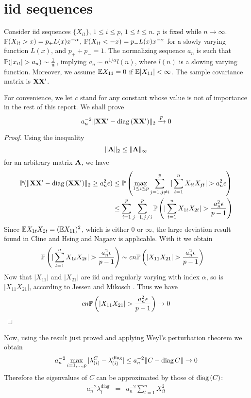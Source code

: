 \documentclass{article}
\begin{document}
\section{iid sequences}\label{sec:iid}
Consider iid sequences $\{X_{it}\}$, $1 \leq i \leq p$, $1 \leq t \leq
n$. $p$ is fixed while $n \to \infty$. $\mathbb{P}(X_{it} > x) = p_+ L(x)
x^{-\alpha}$, $\mathbb{P}(X_{it} < -x) = p_- L(x) x^{-\alpha}$ for a slowly
varying function $L(x)$, and $p_+ + p_- = 1$. The normalizing sequence
$a_n$ is such that $\mathbb{P}(|x_{it}| > a_n) \sim {1 \over n}$, implying
$a_n \sim n^{1/\alpha} l(n)$, where $l(n)$ is a slowing varying
function. Moreover, we assume $\mathbb{E} X_{11} = 0$ if $\mathbb{E} |X_{11}| <
\infty$. The sample covariance matrix is $\mathbf{XX'}$.

For convenience, we let $c$ stand for any constant whose value is not
of importance in the rest of this report. We shall prove
\[
a_n^{-2}\|\mathbf{XX'} - \text{diag\,}(\mathbf{XX'})\|_2 \xrightarrow{P} 0
\]

\begin{proof}
  Using the inequality
  \[
  \|\mathbf{A}\|_2 \leq \|\mathbf{A}\|_\infty
  \]
  for an arbitrary matrix $\mathbf{A}$, we have
  \begin{align*}
    \mathbb{P}(\|\mathbf{XX'} - \text{diag\,}(\mathbf{XX'})\|_2 \geq a_n^2 \epsilon) & \leq
    \mathbb{P}\left(\max_{1\leq i \leq p} \sum_{j=1, j\neq i}^p |\sum_{t=1}^n
    X_{it} X_{jt}| > a_n^2 \epsilon\right) \\
    &\leq \sum_{i=1}^p \sum_{j=1, j\neq i}^p \mathbb{P}\left(|\sum_{t=1}^n
    X_{1t} X_{2t}| > {a_n^2 \epsilon \over p-1}\right) \\
  \end{align*}
  Since $\mathbb{E} X_{1t} X_{2t} = (\mathbb{E} X_{11})^2$, which is either 0 or
  $\infty$, the large deviation result found in Cline and Hsing
  \cite{ClingHsing1998} and Nagaev \cite{nagaev1979} is
  applicable. With it we obtain
  \begin{align*}
    \mathbb{P}\left(|\sum_{t=1}^n X_{1t} X_{2t}| > {a_n^2 \epsilon \over p-1}\right) &\sim
    c n \mathbb{P}\left(|X_{11} X_{21}| > {a_n^2 \epsilon \over p-1 }\right)
  \end{align*}
  Now that $|X_{11}|$ and $|X_{21}|$ are iid and regularly varying
  with index $\alpha$, so is $|X_{11} X_{21}|$, according to Jessen
  and Mikosch \cite{JessenMikosch2006}. Thus we have
  \[
  c n \mathbb{P}\left(|X_{11} X_{21}| > {a_n^2 \epsilon \over p-1 }\right)
  \to 0
  \]
\end{proof}
Now, using the result just proved and applying Weyl's perturbation
theorem we obtain
\[
a_n^{-2} \max_{i=1,\dots,p} |\lambda^C_{(i)} -
\lambda^{\text{diag}}_{(i)}| \leq  a_n^{-2}\|C - \text{diag\,}{C}\| \to 0
\]
Therefore the eigenvalues of $C$ can be approximated by those of
$\text{diag\,}(C)$:
\begin{eqnarray*}
a_n^{-2}\lambda^{\text{diag}}_{i}  &=& a_n^{-2} \sum_{t=1}^n X_{it}^2
\end{eqnarray*}
\end{document}
